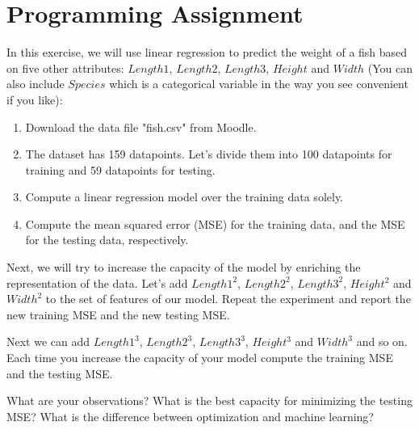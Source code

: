 \documentclass[11pt,oneside,a4paper]{article}
\theoremstyle{definition}
\DeclareRobustCommand{\[}{\begin{equation}}
\DeclareRobustCommand{\]}{\end{equation}}
\begin{document}
\section*{Programming Assignment} 
In this exercise, we will use linear regression to predict the weight of a fish based on five other attributes: $Length1$, $Length2$, $Length3$, $Height$ and $Width$ (You can also include $Species$ which is a categorical variable in the way you see convenient if you like): 
\begin{enumerate}
    \item  Download the data file "fish.csv" from Moodle. 
    \item The dataset has 159 datapoints. Let's divide them into 100 datapoints for training and 59 datapoints for testing. 
    \item Compute a linear regression model over the training data solely. 
    \item Compute the mean squared error (MSE) for the training data, and the MSE for the testing data, respectively.
\end{enumerate}

Next, we will try to increase the capacity of the model by enriching the representation of the data. 
Let's add $Length1^2$, $Length2^2$, $Length3^2$, $Height^2$ and $Width^2$ to the set of features of our model. Repeat the experiment and report the new training MSE and the new testing MSE. 

Next we can add $Length1^3$, $Length2^3$, $Length3^3$, $Height^3$ and $Width^3$ and so on. Each time you increase the capacity of your model compute the training MSE and the testing MSE. 

What are your observations? What is the best capacity for minimizing the testing MSE? What is the difference between optimization and machine learning? 




% 
% 
\end{document}
